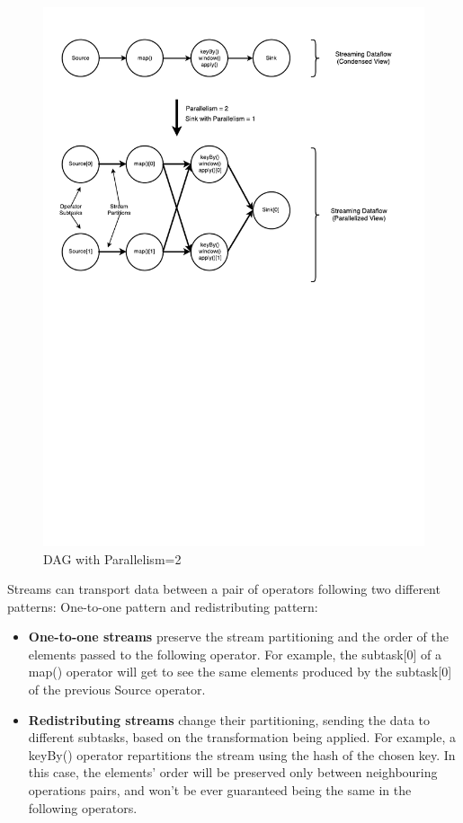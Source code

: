 \begin{figure}[ht]
    \centering
    \includegraphics[scale=0.75, trim=0.5cm 12cm 1cm 0.5cm]{Figures/parallel_dataflow.pdf}
    \decoRule
    \caption[Parallel Dataflow]{DAG with Parallelism=2}
    \label{fig:ParallelDataflow}
\end{figure}

Streams can transport data between a pair of operators following two different patterns: One-to-one pattern and redistributing pattern:
\begin{itemize}
	\item \textbf{One-to-one streams} preserve the stream partitioning and the order of the elements passed to the following operator. For example, the subtask[0] of a map() operator will get to see the same elements produced by the subtask[0] of the previous Source operator.
   
    \item \textbf{Redistributing streams} change their partitioning, sending the data to different subtasks, based on the transformation being applied. For example, a keyBy() operator repartitions the stream using the hash of the chosen key. In this case, the elements' order will be preserved only between neighbouring operations pairs, and won't be ever guaranteed being the same in the following operators.
\end{itemize}


